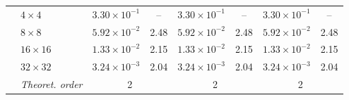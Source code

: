 \documentclass[11pt,a4paper]{article}
\numberwithin{equation}{section}
\theoremstyle{plain}
\theoremstyle{definition}
\theoremstyle{remark}
\begin{document}
\begin{table}[htbp]
\begin{tabular}{llcc|cc|cc}
\addlinespace
\multirow{5}{*}{Pressure}
& $4\times4$   & $3.30\times10^{-1}$ & --   & $3.30\times10^{-1}$ & --   & $3.30\times10^{-1}$ & --   \\
& $8\times8$   & $5.92\times10^{-2}$ & 2.48 & $5.92\times10^{-2}$ & 2.48 & $5.92\times10^{-2}$ & 2.48 \\
& $16\times16$ & $1.33\times10^{-2}$ & 2.15 & $1.33\times10^{-2}$ & 2.15 & $1.33\times10^{-2}$ & 2.15 \\
& $32\times32$ & $3.24\times10^{-3}$ & 2.04 & $3.24\times10^{-3}$ & 2.04 & $3.24\times10^{-3}$ & 2.04 \\
& \textit{Theoret. order}
& \multicolumn{2}{c|}{2}
& \multicolumn{2}{c|}{2}
& \multicolumn{2}{c}{2} \\

\bottomrule
\end{tabular}
\end{table}
\end{document}
